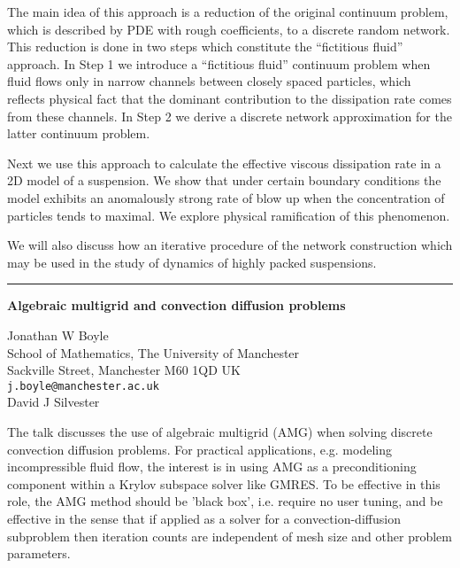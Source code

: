 \documentclass[twosided]{report}
\begin{document}
The main idea of this
approach is a reduction of the original continuum problem,
which is described by PDE with rough coefficients, to a
discrete random network. This reduction is done in two steps
which constitute the ``fictitious fluid'' approach. In Step 1
we introduce a ``fictitious fluid'' continuum problem when
fluid flows only in narrow channels between closely spaced
particles, which reflects physical fact that the dominant
contribution to the dissipation rate comes from these
channels. In Step 2 we derive a discrete network
approximation for the latter continuum problem.

Next we
use this approach to calculate the effective viscous
dissipation rate in a 2D model of a suspension. We show that
under certain boundary conditions the model exhibits an
anomalously strong rate of blow up when the concentration of
particles tends to maximal. We explore physical ramification
of this phenomenon.

We will also discuss how an
iterative procedure of the network construction which may be
used in the study of dynamics of highly packed suspensions.



	\begin{center} \rule{6in}{1pt} \end{center}

\begin{center}
{\large			%
{\bf Algebraic multigrid and convection diffusion problems}}

	Jonathan W Boyle \\
	School of Mathematics, The University of Manchester \\
	Sackville Street, Manchester M60 1QD UK \\
	{\tt j.boyle@manchester.ac.uk} \\
	David J Silvester
\end{center}
The talk discusses the use of algebraic multigrid (AMG) when
solving discrete convection diffusion problems. For
practical applications, e.g. modeling incompressible fluid
flow, the interest is in using AMG as a preconditioning
component within a Krylov subspace solver like GMRES. To be
effective in this role, the AMG method should be 'black
box', i.e. require no user tuning, and be effective in the
sense that if applied as a solver for a convection-diffusion
subproblem then iteration counts are independent of mesh
size and other problem parameters.
\end{document}
